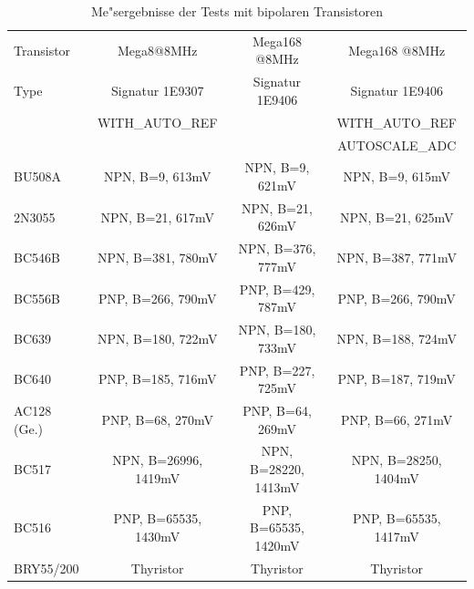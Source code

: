 \begin{table}[H]
  \begin{center}
    \begin{tabular}{| l | c | c | c |}
    \hline
     Transistor & Mega8@8MHz & Mega168 @8MHz & Mega168 @8MHz \\
     Type   & Signatur 1E9307 & Signatur 1E9406 & Signatur 1E9406 \\
           & WITH\_AUTO\_REF &  & WITH\_AUTO\_REF \\
           &                 &  & AUTOSCALE\_ADC \\
    \hline
    \hline
BU508A & NPN, B=9, 613mV & NPN, B=9, 621mV & NPN, B=9, 615mV\\
    \hline
2N3055 & NPN, B=21, 617mV & NPN, B=21, 626mV & NPN, B=21, 625mV\\
    \hline
BC546B & NPN, B=381, 780mV & NPN, B=376, 777mV & NPN, B=387, 771mV\\
    \hline
BC556B & PNP, B=266, 790mV & PNP, B=429, 787mV & PNP, B=266, 790mV\\
    \hline
BC639 & NPN, B=180, 722mV & NPN, B=180, 733mV & NPN, B=188, 724mV\\

    \hline
BC640 & PNP, B=185, 716mV & PNP, B=227, 725mV & PNP, B=187, 719mV\\
    \hline
AC128 (Ge.) & PNP, B=68, 270mV & PNP, B=64, 269mV & PNP, B=66, 271mV\\
    \hline
BC517 & NPN, B=26996, 1419mV & NPN, B=28220, 1413mV & NPN, B=28250, 1404mV\\
    \hline
BC516 & PNP, B=65535, 1430mV & PNP, B=65535, 1420mV & PNP, B=65535, 1417mV\\
    \hline
BRY55/200 & Thyristor & Thyristor & Thyristor\\
    \hline
    \end{tabular}
  \end{center}
  \caption{Me"sergebnisse der Tests mit bipolaren Transistoren}
  \label{tab:bipolar} 
\end{table}


